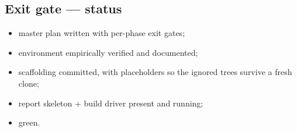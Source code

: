 \subsection{Exit gate --- status}

\begin{itemize}
  \item[\checkmark] master plan written with per-phase exit gates;
  \item[\checkmark] environment empirically verified and documented;
  \item[\checkmark] scaffolding committed, with  placeholders so the
    ignored trees survive a fresh clone;
  \item[\checkmark] report skeleton + build driver present and running;
  \item[\checkmark]  green.
\end{itemize}
